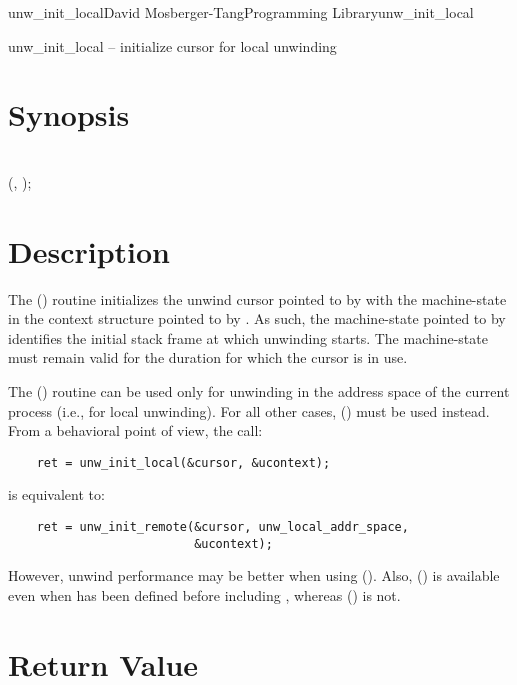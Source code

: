 \documentclass{article}
\begin{document}
\begin{Name}{3}{unw\_init\_local}{David Mosberger-Tang}{Programming Library}{unw\_init\_local}

  unw\_init\_local -- initialize cursor for local unwinding
\end{Name}

\section{Synopsis}

\\

 (, );\\

\section{Description}

The () routine initializes the unwind cursor
pointed to by  with the machine-state in the context structure
pointed to by .  As such, the machine-state pointed to by
 identifies the initial stack frame at which unwinding
starts.  The machine-state must remain valid for the duration for
which the cursor  is in use.

The () routine can be used only for unwinding in
the address space of the current process (i.e., for local unwinding).
For all other cases, () must be used instead.
From a behavioral point of view, the call:

\begin{verbatim}
    ret = unw_init_local(&cursor, &ucontext);
\end{verbatim}
is equivalent to:

\begin{verbatim}
    ret = unw_init_remote(&cursor, unw_local_addr_space,
                          &ucontext);
\end{verbatim}
However, unwind performance may be better when using
().  Also, () is
available even when  has been defined before
including , whereas ()
is not.

\section{Return Value}
\end{document}
